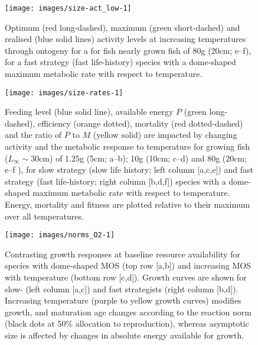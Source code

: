\documentclass[11pt]{article}\usepackage[]{graphicx}\usepackage[]{color}
\makeatletter
\def\maxwidth{ %
  \ifdim\Gin@nat@width>\linewidth
    \linewidth
  \else
    \Gin@nat@width
  \fi
}
\makeatother
\begin{document}
\begin{figure}

{\centering \texttt{[image: images/size-act\_low-1]} 

}

\caption[Optimum (red long-dashed), maximum (green short-dashed) and realised (blue solid lines) activity levels at increasing temperatures through ontogeny for a for fish nearly grown fish of 80g (20cm]{Optimum (red long-dashed), maximum (green short-dashed) and realised (blue solid lines) activity levels at increasing temperatures through ontogeny for a for fish nearly grown fish of 80g (20cm; e--f), for a fast strategy (fast life-history) species with a dome-shaped maximum metabolic rate with respect to temperature. }\label{fig:size-act_low}
\end{figure}



\begin{figure}

{\centering \texttt{[image: images/size-rates-1]} 

}

\caption[Feeding level (blue solid line), available energy $P$ (green long-dashed), efficiency (orange dotted), mortality (red dotted-dashed) and the ratio of $P$ to $M$ (yellow solid) are impacted by changing activity and the metabolic response to temperature for growing fish ($L_{\infty}\sim 30$cm) of 1.25g (5cm]{Feeding level (blue solid line), available energy $P$ (green long-dashed), efficiency (orange dotted), mortality (red dotted-dashed) and the ratio of $P$ to $M$ (yellow solid) are impacted by changing activity and the metabolic response to temperature for growing fish ($L_{\infty}\sim 30$cm) of 1.25g (5cm; a--b); 10g (10cm; c--d) and 80g (20cm; e--f ), for slow strategy (slow life history; left column [a,c,e]) and fast strategy (fast life-history; right column [b,d,f]) species with a dome-shaped maximum metabolic rate with respect to temperature. Energy, mortality and fitness are plotted relative to their maximum over all temperatures.}\label{fig:size-rates}
\end{figure}




\begin{figure}
\centering


{\centering \texttt{[image: images/norms\_O2-1]} 

}



\caption{Contrasting growth responses at baseline resource availability for species with dome-shaped MOS (top row [a,b]) and increasing MOS with temperature (bottom row [c,d]). Growth curves are shown for slow- (left column [a,c]) and fast strategists (right column [b,d]). Increasing temperature (purple to yellow growth curves) modifies growth, and maturation age changes according to the reaction norm (black dots at 50\% allocation to reproduction), whereas asymptotic size is affected by changes in absolute energy available for growth.}
\label{fig:norms_O2}
\end{figure}
\end{document}
